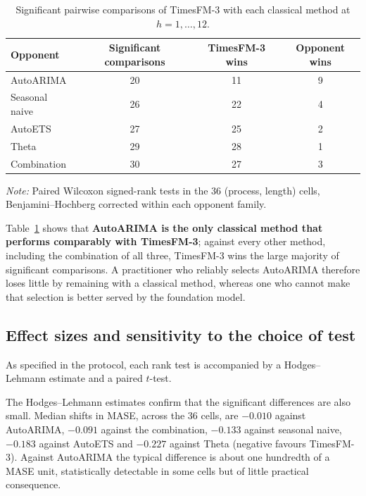 \documentclass[11pt]{article}
\providecommand{\tableref}[1]{Table~\ref{#1}}
\begin{document}
\begin{table}[!htbp]
\centering
\begin{threeparttable}
\caption{Significant pairwise comparisons of TimesFM-3 with each classical method at
$h = 1,\dots,12$.}
\label{tab:opponents}
\begin{tabular}{lccc}
\toprule
Opponent & Significant comparisons & TimesFM-3 wins & Opponent wins \\
\midrule
AutoARIMA          & 20 & 11 & 9 \\
Seasonal naive     & 26 & 22 & 4 \\
AutoETS            & 27 & 25 & 2 \\
Theta              & 29 & 28 & 1 \\
Combination        & 30 & 27 & 3 \\
\bottomrule
\end{tabular}
\begin{tablenotes}[flushleft]\footnotesize
\item \textit{Note:} Paired Wilcoxon signed-rank tests in the 36 (process, length) cells,
Benjamini--Hochberg corrected within each opponent family.
\end{tablenotes}
\end{threeparttable}
\end{table}

\tableref{tab:opponents} shows that \textbf{AutoARIMA is the only classical method that performs
comparably with TimesFM-3}; against every other method, including the combination of all three,
TimesFM-3 wins the large majority of significant comparisons. A practitioner who reliably selects
AutoARIMA therefore loses little by remaining with a classical method, whereas one who cannot make
that selection is better served by the foundation model.

\subsection{Effect sizes and sensitivity to the choice of test}
\label{sec:effects}

As specified in the protocol, each rank test is accompanied by a Hodges--Lehmann estimate and a
paired $t$-test.

The Hodges--Lehmann estimates confirm that the significant differences are also small. Median
shifts in MASE, across the 36 cells, are $-0.010$ against AutoARIMA, $-0.091$ against the
combination, $-0.133$ against seasonal naive, $-0.183$ against AutoETS and $-0.227$ against Theta
(negative favours TimesFM-3). Against AutoARIMA the typical difference is about one hundredth of
a MASE unit, statistically detectable in some cells but of little practical consequence.
\end{document}
